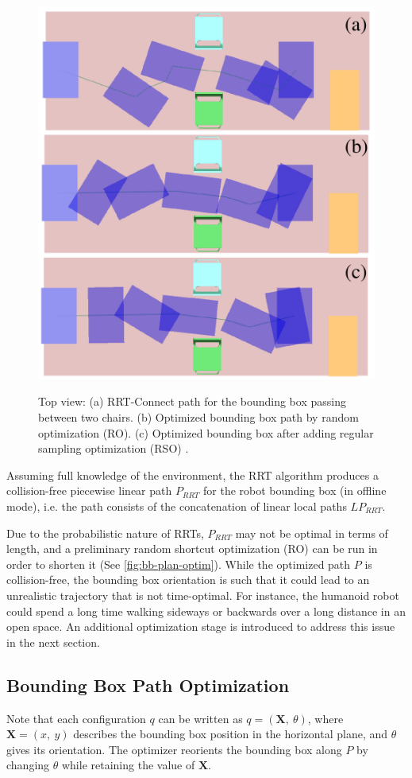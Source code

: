 \begin{figure}
  \centering
      {\includegraphics[width = 0.8\linewidth]
        {src/chap1-path-optimization/bb-plan-optim.pdf}}
      \caption{Top view: (a) RRT-Connect path for the bounding box
        passing between two chairs. (b) Optimized bounding box path by
        random optimization (RO). (c) Optimized bounding box after
        adding regular sampling optimization (RSO) .}
      \label{fig:bb-plan-optim}
\end{figure}

Assuming full knowledge of the environment, the RRT
algorithm produces a collision-free piecewise linear path $P_{RRT}$
for the robot bounding box (in offline mode), i.e. the path consists
of the concatenation of linear local paths $LP_{RRT}$.

Due to the probabilistic nature of RRTs, $P_{RRT}$ may not be optimal
in terms of length, and a preliminary random shortcut optimization
(RO) can be run in order to shorten it (See
\autoref{fig:bb-plan-optim}). While the optimized path $P$ is
collision-free, the bounding box orientation is such that it could
lead to an unrealistic trajectory that is not time-optimal. For
instance, the humanoid robot could spend a long time walking sideways
or backwards over a long distance in an open space. An additional
optimization stage is introduced to address this issue in the next
section.

\subsection{Bounding Box Path Optimization}
Note that each configuration $q$ can be written as $q =
(\mathbf{X},~\theta)$, where $\mathbf{X} = (x,~y)$ describes the
bounding box position in the horizontal plane, and $\theta$ gives its
orientation.  The optimizer reorients the bounding box along $P$ by
changing $\theta$ while retaining the value of $\mathbf{X}$.

